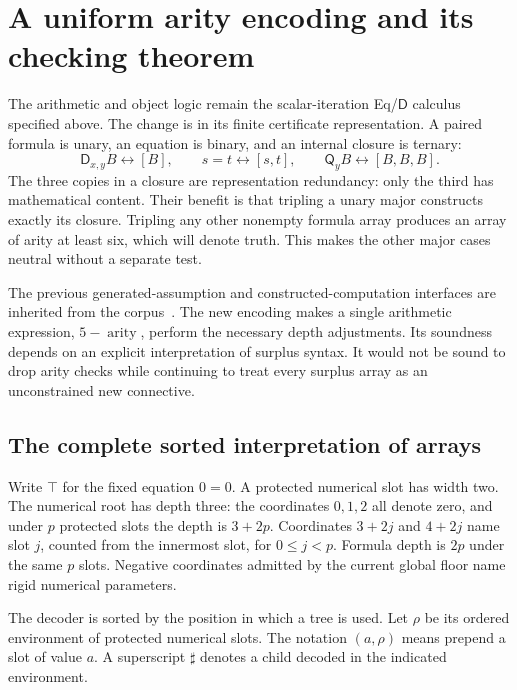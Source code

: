 \documentclass[11pt,letterpaper]{article}
\theoremstyle{definition}
\newcommand{\D}{\mathsf D}
\newcommand{\Q}{\mathsf Q}
\begin{document}
\section{A uniform arity encoding and its checking theorem}
\label{sec:arity-checker}

The arithmetic and object logic remain the scalar-iteration Eq/$\D$
calculus specified above.  The change is in its finite certificate
representation.  A paired formula is unary, an equation is binary, and
an internal closure is ternary:
\[
 \D_{x,y}B\longleftrightarrow[B],\qquad
 s=t\longleftrightarrow[s,t],\qquad
 \Q_yB\longleftrightarrow[B,B,B].
 \tag{Arity encoding}\label{eq:arity-encoding}
\]
The three copies in a closure are representation redundancy: only the
third has mathematical content.  Their benefit is that tripling a unary
major constructs exactly its closure.  Tripling any other nonempty
formula array produces an array of arity at least six, which will denote
truth.  This makes the other major cases neutral without a separate
test.

The previous generated-assumption and constructed-computation interfaces
are inherited from the corpus~\cite{generated,constructed}.  The new
encoding makes a single arithmetic expression, $5-\operatorname{arity}$,
perform the necessary depth adjustments.  Its soundness depends on an
explicit interpretation of surplus syntax.  It would not be sound to
drop arity checks while continuing to treat every surplus array as an
unconstrained new connective.

\subsection{The complete sorted interpretation of arrays}
\label{subsec:sorted-arrays}

Write $\top$ for the fixed equation $0=0$.  A protected numerical slot
has width two.  The numerical root has depth three: the coordinates
$0,1,2$ all denote zero, and under $p$ protected slots the depth is
$3+2p$.  Coordinates $3+2j$ and $4+2j$ name slot $j$, counted from
the innermost slot, for $0\leq j<p$.  Formula depth is $2p$ under the
same $p$ slots.  Negative coordinates admitted by the current global
floor name rigid numerical parameters.

The decoder is sorted by the position in which a tree is used.  Let
$\rho$ be its ordered environment of protected numerical slots.
The notation $(a,\rho)$ means prepend a slot of value $a$.
A superscript $\sharp$ denotes a child decoded in the indicated
environment.
\end{document}
